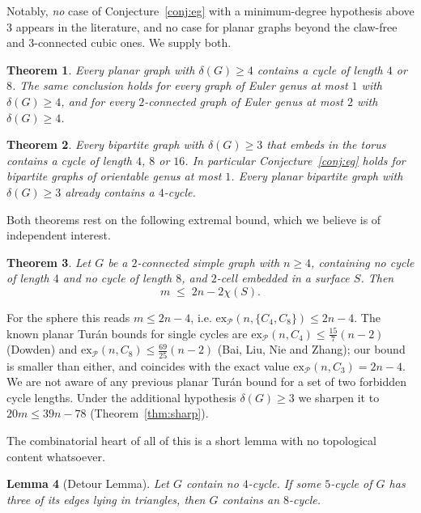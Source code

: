 \documentclass[11pt]{article}
\theoremstyle{plain}
\newtheorem{theorem}{Theorem}
\newtheorem{lemma}[theorem]{Lemma}
\theoremstyle{definition}
\newcommand{\Cfour}{C_4}
\newcommand{\Ceight}{C_8}
\begin{document}
Notably, \emph{no} case of Conjecture~\ref{conj:eg} with a minimum-degree
hypothesis above $3$ appears in the literature, and no case for planar graphs
beyond the claw-free and $3$-connected cubic ones. We supply both.

\begin{theorem}\label{thm:main-planar}
Every planar graph with $\delta(G)\ge4$ contains a cycle of length $4$ or $8$.
The same conclusion holds for every graph of Euler genus at most $1$ with
$\delta(G)\ge4$, and for every $2$-connected graph of Euler genus at most $2$
with $\delta(G)\ge4$.
\end{theorem}

\begin{theorem}\label{thm:main-bip}
Every bipartite graph with $\delta(G)\ge3$ that embeds in the torus contains a
cycle of length $4$, $8$ or $16$. In particular Conjecture~\ref{conj:eg} holds
for bipartite graphs of orientable genus at most $1$. Every \emph{planar}
bipartite graph with $\delta(G)\ge3$ already contains a $4$-cycle.
\end{theorem}

Both theorems rest on the following extremal bound, which we believe is of
independent interest.

\begin{theorem}\label{thm:density}
Let $G$ be a $2$-connected simple graph with $n\ge4$, containing no cycle of
length $4$ and no cycle of length $8$, and $2$-cell embedded in a surface $S$.
Then
\[
  m\;\le\;2n-2\chi(S).
\]
\end{theorem}

For the sphere this reads $m\le 2n-4$, i.e.
$\mathrm{ex}_{\mathcal P}(n,\{\Cfour,\Ceight\})\le 2n-4$. The known planar
Tur\'an bounds for single cycles are $\mathrm{ex}_{\mathcal P}(n,\Cfour)\le
\tfrac{15}{7}(n-2)$ (Dowden) and $\mathrm{ex}_{\mathcal P}(n,\Ceight)\le
\tfrac{69}{25}(n-2)$ (Bai, Liu, Nie and Zhang); our bound is smaller than
either, and coincides with the exact value $\mathrm{ex}_{\mathcal
P}(n,C_3)=2n-4$. We are not aware of any previous planar Tur\'an bound for a set
of two forbidden cycle lengths. Under the additional hypothesis
$\delta(G)\ge3$ we sharpen it to $20m\le 39n-78$ (Theorem~\ref{thm:sharp}).

The combinatorial heart of all of this is a short lemma with no topological
content whatsoever.

\begin{lemma}[Detour Lemma]\label{lem:detour}
Let $G$ contain no $4$-cycle. If some $5$-cycle of $G$ has three of its edges
lying in triangles, then $G$ contains an $8$-cycle.
\end{lemma}
\end{document}

